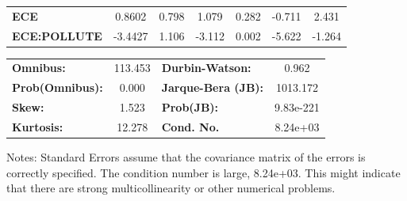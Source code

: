 \begin{center}
\begin{tabular}{lcccccc}
\textbf{ECE}          &       0.8602  &        0.798     &     1.079  &         0.282        &       -0.711    &        2.431     \\
\textbf{ECE:POLLUTE}  &      -3.4427  &        1.106     &    -3.112  &         0.002        &       -5.622    &       -1.264     \\
\bottomrule
\end{tabular}
\begin{tabular}{lclc}
\textbf{Omnibus:}       & 113.453 & \textbf{  Durbin-Watson:     } &     0.962  \\
\textbf{Prob(Omnibus):} &   0.000 & \textbf{  Jarque-Bera (JB):  } &  1013.172  \\
\textbf{Skew:}          &   1.523 & \textbf{  Prob(JB):          } & 9.83e-221  \\
\textbf{Kurtosis:}      &  12.278 & \textbf{  Cond. No.          } &  8.24e+03  \\
\bottomrule
\end{tabular}
\end{center}

Notes: \newline
 [1] Standard Errors assume that the covariance matrix of the errors is correctly specified. \newline
 [2] The condition number is large, 8.24e+03. This might indicate that there are \newline
 strong multicollinearity or other numerical problems.